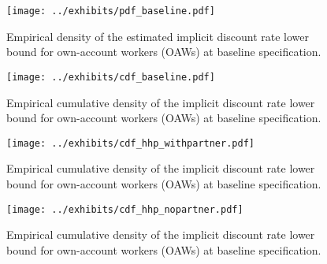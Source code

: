 



\usepackage[backend = biber, abbreviate = false, date = year,  isbn =  false, hyperref = false, style = chicago-authordate]{biblatex}
\renewcommand*{\nameyeardelim}{\addcomma\space}   %
\setcounter{biburllcpenalty}{9000}                %







\newpage


\begin{figure}[H]
\caption{Empirical density of the estimated implicit discount rate lower bound for own-account workers (OAWs) at baseline specification.}
\texttt{[image: ../exhibits/pdf\_baseline.pdf]}
\end{figure}

\begin{figure}[H]
\caption{Empirical cumulative density of the implicit discount rate lower bound for own-account workers (OAWs) at baseline specification.}
\texttt{[image: ../exhibits/cdf\_baseline.pdf]}
\end{figure}

\newpage

\begin{figure}[H]
\caption{Empirical cumulative density of the implicit discount rate lower bound for own-account workers (OAWs) at baseline specification.}
\texttt{[image: ../exhibits/cdf\_hhp\_withpartner.pdf]}
\end{figure}

\begin{figure}[H]
\caption{Empirical cumulative density of the implicit discount rate lower bound for own-account workers (OAWs) at baseline specification.}
\texttt{[image: ../exhibits/cdf\_hhp\_nopartner.pdf]}
\end{figure}

